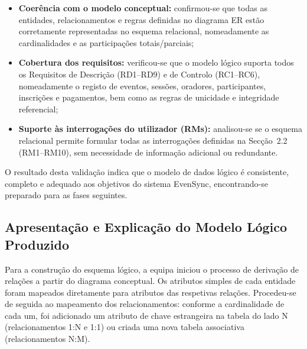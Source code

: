 \documentclass[runningheads]{llncs}
\begin{document}
                \begin{itemize}
                    \item \textbf{Coerência com o modelo conceptual:} confirmou-se que todas as
                    entidades, relacionamentos e regras definidas no diagrama ER estão corretamente
                    representadas no esquema relacional, nomeadamente as cardinalidades e as
                    participações totais/parciais;

                    \item \textbf{Cobertura dos requisitos:} verificou-se que o modelo lógico suporta
                    todos os Requisitos de Descrição (RD1--RD9) e de Controlo (RC1--RC6),
                    nomeadamente o registo de eventos, sessões, oradores, participantes, inscrições
                    e pagamentos, bem como as regras de unicidade e integridade referencial;

                    \item \textbf{Suporte às interrogações do utilizador (RMs):} analisou-se se o
                    esquema relacional permite formular todas as interrogações definidas na Secção~2.2
                    (RM1--RM10), sem necessidade de informação adicional ou redundante.
                \end{itemize}

                \noindent O resultado desta validação indica que o modelo de dados lógico é
                consistente, completo e adequado aos objetivos do sistema EvenSync,
                encontrando-se preparado para as fases seguintes.

                \subsection{Apresentação e Explicação do Modelo Lógico Produzido}

                Para a construção do esquema lógico, a equipa iniciou o processo de derivação de
                relações a partir do diagrama conceptual. Os atributos simples de cada entidade foram
                mapeados diretamente para atributos das respetivas relações. Procedeu-se de seguida ao
                mapeamento dos relacionamentos: conforme a cardinalidade de cada um, foi adicionado um
                atributo de chave estrangeira na tabela do lado N (relacionamentos 1:N e 1:1) ou criada
                uma nova tabela associativa (relacionamentos N:M).
\end{document}

